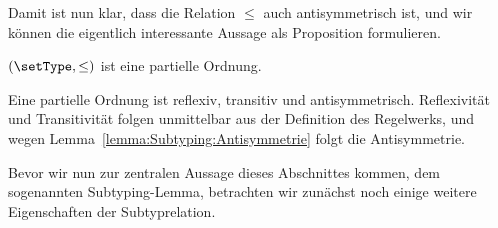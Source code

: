 Damit ist nun klar, dass die Relation $\le$ auch antisymmetrisch ist, und wir k\"onnen die eigentlich interessante
Aussage als Proposition formulieren.

\begin{proposition}
  $(\setType, \le)$ ist eine partielle Ordnung.
\end{proposition}

\begin{beweis}
  Eine partielle Ordnung ist reflexiv, transitiv und antisymmetrisch.
  Reflexivit\"at und Transitivit\"at folgen unmittelbar aus der Definition des
  Regelwerks, und wegen Lemma~\ref{lemma:Subtyping:Antisymmetrie} folgt die
  Antisymmetrie.
\end{beweis}

Bevor wir nun zur zentralen Aussage dieses Abschnittes kommen, dem sogenannten Subtyping-Lemma, betrachten
wir zun\"achst noch einige weitere Eigenschaften der Subtyprelation.

